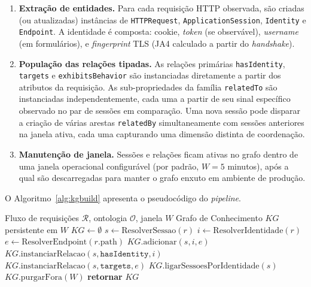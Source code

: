 \documentclass[preprint,12pt]{elsarticle}
\begin{document}
\begin{enumerate}
    \item \textbf{Extração de entidades.} Para cada requisição HTTP observada, são criadas (ou atualizadas) instâncias de \texttt{HTTPRequest}, \texttt{ApplicationSession}, \texttt{Identity} e \texttt{Endpoint}. A identidade é composta: cookie, \emph{token} (se observável), \emph{username} (em formulários), e \emph{fingerprint} TLS (JA4 calculado a partir do \emph{handshake}).
    \item \textbf{População das relações tipadas.} As relações primárias \texttt{hasIdentity}, \texttt{targets} e \texttt{exhibitsBehavior} são instanciadas diretamente a partir dos atributos da requisição. As sub-propriedades da família \texttt{relatedTo} são instanciadas independentemente, cada uma a partir de seu sinal específico observado no par de sessões em comparação. Uma nova sessão pode disparar a criação de várias arestas \texttt{relatedBy} simultaneamente com sessões anteriores na janela ativa, cada uma capturando uma dimensão distinta de coordenação.
    \item \textbf{Manutenção de janela.} Sessões e relações ficam ativas no grafo dentro de uma janela operacional configurável (por padrão, $W = 5$ minutos), após a qual são descarregadas para manter o grafo enxuto em ambiente de produção.
\end{enumerate}

O Algoritmo~\ref{alg:kgbuild} apresenta o pseudocódigo do \emph{pipeline}.

\begin{algorithm}[H]
\caption{Construção do Grafo de Conhecimento em Tempo de Execução}
\label{alg:kgbuild}
\begin{algorithmic}[1]
\REQUIRE Fluxo de requisições $\mathcal{R}$, ontologia $\mathcal{O}$, janela $W$
\ENSURE Grafo de Conhecimento $KG$ persistente em $W$
\STATE $KG \leftarrow \emptyset$
    \STATE $s \leftarrow \text{ResolverSessao}(r)$
    \STATE $i \leftarrow \text{ResolverIdentidade}(r)$
    \STATE $e \leftarrow \text{ResolverEndpoint}(r.\text{path})$
    \STATE $KG.\text{adicionar}(s, i, e)$
    \STATE $KG.\text{instanciarRelacao}(s, \texttt{hasIdentity}, i)$
    \STATE $KG.\text{instanciarRelacao}(s, \texttt{targets}, e)$
    \STATE $KG.\text{ligarSessoesPorIdentidade}(s)$
    \STATE $KG.\text{purgarFora}(W)$
\ENDFOR
\STATE \textbf{retornar} $KG$
\end{algorithmic}
\end{algorithm}
\end{document}
